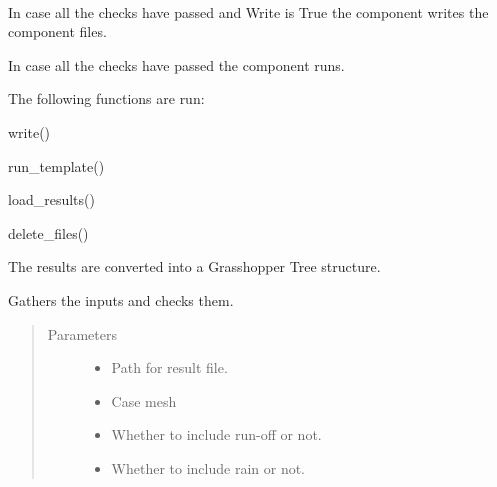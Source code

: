 \documentclass[letterpaper,10pt,english]{sphinxmanual}
\begin{document}
\begin{fulllineitems}

\begin{fulllineitems}
\label{\detokenize{cmf:livestock.components.comp_cmf.CMFSurfaceFluxResult.run}}~
\begin{DUlineblock}{0em}
\item[] In case all the checks have passed and Write is True the component writes the component files.
\item[] In case all the checks have passed the component runs.
\item[] The following functions are run:
\item[] write()
\item[] run\_template()
\item[] load\_results()
\item[] delete\_files()
\item[] The results are converted into a Grasshopper Tree structure.
\end{DUlineblock}

\end{fulllineitems}


\begin{fulllineitems}
\label{\detokenize{cmf:livestock.components.comp_cmf.CMFSurfaceFluxResult.run_checks}}
Gathers the inputs and checks them.
\begin{quote}\begin{description}
\item[{Parameters}] \leavevmode\begin{itemize}
\item {} 
 \textendash{} Path for result file.

\item {} 
 \textendash{} Case mesh

\item {} 
 \textendash{} Whether to include run-off or not.

\item {} 
 \textendash{} Whether to include rain or not.


\end{itemize}
\end{description}
\end{quote}
\end{fulllineitems}
\end{fulllineitems}
\end{document}
